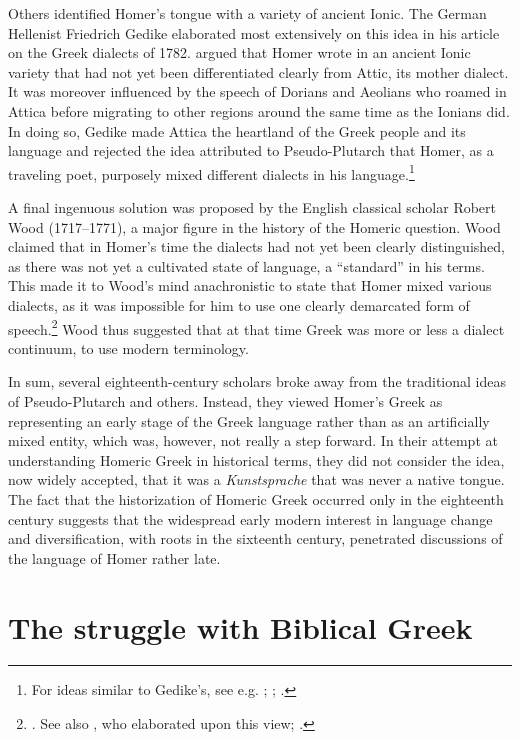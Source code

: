 Others identified Homer’s tongue with a variety of ancient Ionic. The German Hellenist Friedrich Gedike elaborated most extensively on this idea in his article on the Greek dialects of 1782. \citet[22-23]{Gedike1782} argued that Homer wrote in an ancient Ionic variety that had not yet been differentiated clearly from Attic, its mother dialect. It was moreover influenced by the speech of Dorians and Aeolians who roamed in Attica before migrating to other regions around the same time as the Ionians did. In doing so, Gedike made Attica the heartland of the Greek people and its language and rejected the idea attributed to Pseudo-Plutarch that Homer, as a traveling poet, purposely mixed different dialects in his language.\footnote{For ideas similar to Gedike’s, see e.g. \citet[115-116]{Freret1809}; \citet[202]{Beattie1778}; \citet[175-176]{Trendelenburg1782}.}

A final ingenuous solution was proposed by the English classical scholar Robert Wood (1717–1771), a major figure in the history of the Homeric question. Wood claimed that in Homer’s time the dialects had not yet been clearly distinguished, as there was not yet a cultivated state of language, a “standard” in his terms. This made it to Wood’s mind anachronistic to state that Homer mixed various dialects, as it was impossible for him to use one clearly demarcated form of speech.\footnote{\citet[238]{Wood1775}. See also \citet[\textsc{xxiiii–xxv}]{Harles1778}, who elaborated upon this view; \citet[\textsc{v}]{Facius1782}.} Wood thus suggested that at that time Greek was more or less a dialect continuum, to use modern terminology.

In sum, several eighteenth-century scholars broke away from the traditional ideas of Pseudo-Plutarch and others. Instead, they viewed Homer’s Greek as representing an early stage of the Greek language rather than as an artificially mixed entity, which was, however, not really a step forward. In their attempt at understanding Homeric Greek in historical terms, they did not consider the idea, now widely accepted, that it was a \textit{Kunstsprache} that was never a native tongue. The fact that the historization of Homeric Greek occurred only in the eighteenth century suggests that the widespread early modern interest in language change and diversification, with roots in the sixteenth century, penetrated discussions of the language of Homer rather late.

\section{The struggle with Biblical Greek}\label{sec:4.4}

